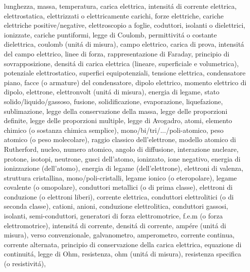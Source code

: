 

\usepackage[italian]{babel}




\begin{multicols}{3}
  lunghezza,
  massa,
  temperatura,
  carica elettrica,
  intensit\'a di corrente elettrica,
  elettrostatica,
  elettrizzati o elettricamente carichi,
  forze elettriche,
  cariche elettriche positive/negative,
  elettroscopio a foglie,
  coduttori,
  isolanti o dielettrici,
  ionizzate,
  cariche puntiformi,
  legge di Coulomb,
  permittivit\'a o costante dielettrica,
  coulomb (unit\'a di misura),
  campo elettrico,
  carica di prova,
  intensit\'a del campo elettrico,
  linee di forza,
  rappresentazione di Faraday,
  principio di sovrapposizione,
  densit\'a di carica elettrica (lineare, superficiale e volumetrica),
  potenziale elettrostatico,
  superfici equipotenziali,
  tensione elettrica,
  condensatore piano,
  facce (o armature) del condensatore,
  dipolo elettrico,
  momento elettrico di dipolo,
  elettrone,
  elettronvolt (unit\'a di misura),
  energia di legame,
  stato solido/liquido/gassoso,
  fusione,
  solidificazione,
  evaporazione,
  liquefazione,
  sublimazione,
  legge della conservazione della massa,
  legge delle proporzioni definite,
  legge delle proporzioni multiple,
  legge di Avogadro,
  atomi,
  elemento chimico (o sostanza chimica semplice),
  mono/bi/tri/.../poli-atomico,
  peso atomico (o peso molecolare),
  raggio classico dell'elettrone,
  modello atomico di Rutherford,
  nucleo,
  numero atomico,
  angolo di diffusione,
  interazione nucleare,
  protone,
  isotopi,
  neutrone,
  gusci dell'atomo,
  ionizzato,
  ione negativo,
  energia di ionizzazione (dell'atomo),
  energia di legame (dell'elettrone),
  elettroni di valenza,
  struttura cristallina,
  mono/poli-cristalli,
  legame ionico (o eteropolare),
  legame covalente (o omopolare),
  conduttori metallici (o di prima classe),
  elettroni di conduzione (o elettroni liberi),
  corrente elettrica,
  conduttori elettrolitici (o di seconda classe),
  cationi,
  anioni,
  conduzione elettrolitica,
  conduttori gassosi,
  isolanti,
  semi-conduttori,
  generatori di forza elettromotrice,
  f.e.m (o forza elettromotrice),
  intensit\'a di corrente,
  densit\'a di corrente,
  amp\'ere (unit\'a di misura),
  verso convenzionale,
  galvanometro,
  amperometro,
  corrente continua,
  corrente alternata,
  principio di conservazione della carica elettrica,
  equazione di continuit\'a,
  legge di Ohm,
  resistenza,
  ohm (unit\'a di misura),
  resistenza specifica (o resistivit\'a),

\end{multicols}
